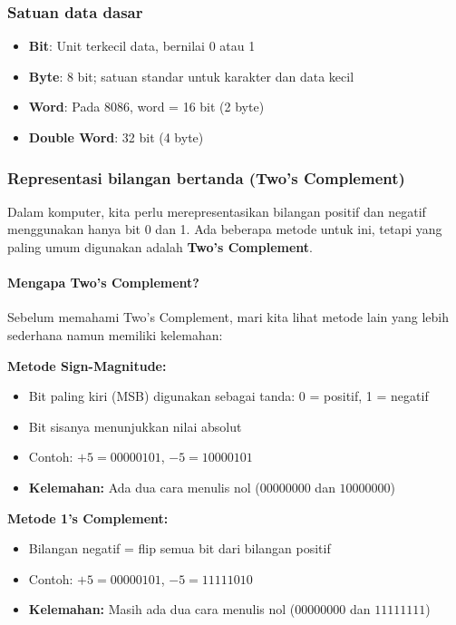 \subsubsection{Satuan data dasar}
\begin{itemize}
    \item \textbf{Bit}: Unit terkecil data, bernilai 0 atau 1
    \item \textbf{Byte}: 8 bit; satuan standar untuk karakter dan data kecil
    \item \textbf{Word}: Pada 8086, word = 16 bit (2 byte)
    \item \textbf{Double Word}: 32 bit (4 byte)
\end{itemize}

\subsubsection{Representasi bilangan bertanda (Two's Complement)}

Dalam komputer, kita perlu merepresentasikan bilangan positif dan negatif menggunakan hanya bit 0 dan 1. Ada beberapa metode untuk ini, tetapi yang paling umum digunakan adalah \textbf{Two's Complement}.

\paragraph{Mengapa Two's Complement?}
Sebelum memahami Two's Complement, mari kita lihat metode lain yang lebih sederhana namun memiliki kelemahan:

\textbf{Metode Sign-Magnitude:}
\begin{itemize}
    \item Bit paling kiri (MSB) digunakan sebagai tanda: 0 = positif, 1 = negatif
    \item Bit sisanya menunjukkan nilai absolut
    \item Contoh: \(+5 = 00000101\), \(-5 = 10000101\)
    \item \textbf{Kelemahan:} Ada dua cara menulis nol (\(00000000\) dan \(10000000\))
\end{itemize}

\textbf{Metode 1's Complement:}
\begin{itemize}
    \item Bilangan negatif = flip semua bit dari bilangan positif
    \item Contoh: \(+5 = 00000101\), \(-5 = 11111010\)
    \item \textbf{Kelemahan:} Masih ada dua cara menulis nol (\(00000000\) dan \(11111111\))
\end{itemize}

